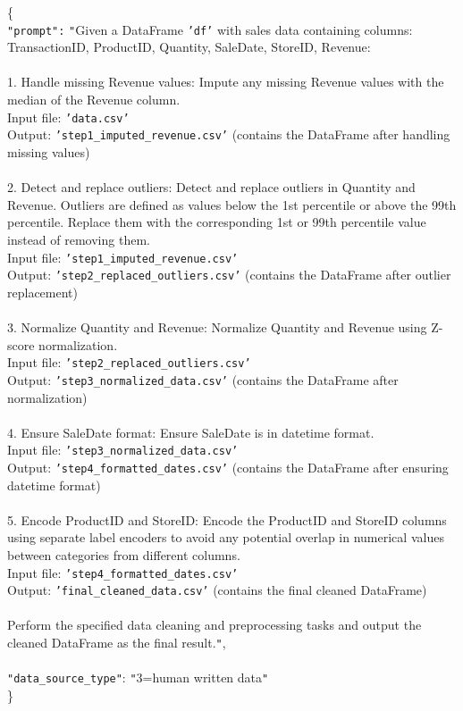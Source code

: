 \begin{tcolorbox}[colback=blue!5!white, colframe=blue!75!black, title=Medium-level Prompt:, text width=\textwidth]
\{ \\
    \texttt{"prompt":} \texttt{"}Given a DataFrame \texttt{'df'} with sales data containing columns: TransactionID, ProductID, Quantity, SaleDate, StoreID, Revenue:\\\\1. Handle missing Revenue values: Impute any missing Revenue values with the median of the Revenue column.  \\   Input file: \texttt{'data.csv'}  \\   Output: \texttt{'step1\_imputed\_revenue.csv'} (contains the DataFrame after handling missing values)\\\\2. Detect and replace outliers: Detect and replace outliers in Quantity and Revenue. Outliers are defined as values below the 1st percentile or above the 99th percentile. Replace them with the corresponding 1st or 99th percentile value instead of removing them.  \\   Input file: \texttt{'step1\_imputed\_revenue.csv'}  \\   Output: \texttt{'step2\_replaced\_outliers.csv'} (contains the DataFrame after outlier replacement)\\\\3. Normalize Quantity and Revenue: Normalize Quantity and Revenue using Z-score normalization.  \\   Input file: \texttt{'step2\_replaced\_outliers.csv'}  \\   Output: \texttt{'step3\_normalized\_data.csv'} (contains the DataFrame after normalization)\\\\4. Ensure SaleDate format: Ensure SaleDate is in datetime format.  \\   Input file: \texttt{'step3\_normalized\_data.csv'}  \\   Output: \texttt{'step4\_formatted\_dates.csv'} (contains the DataFrame after ensuring datetime format)\\\\5. Encode ProductID and StoreID: Encode the ProductID and StoreID columns using separate label encoders to avoid any potential overlap in numerical values between categories from different columns.  \\   Input file: \texttt{'step4\_formatted\_dates.csv'}  \\   Output: \texttt{'final\_cleaned\_data.csv'} (contains the final cleaned DataFrame)\\\\Perform the specified data cleaning and preprocessing tasks and output the cleaned DataFrame as the final result.\texttt{"}, \\\\
    \texttt{"data\_source\_type"}: \texttt{"}3=human written data\texttt{"}
\\
\}
\end{tcolorbox}
